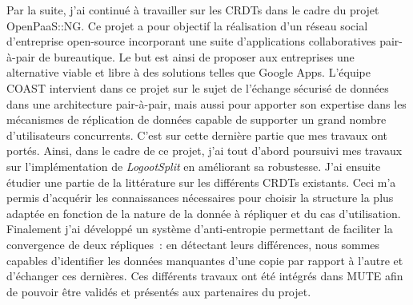 \documentclass[11pt,a4paper,sans]{moderncv}        %
\newcommand{\tab}{\quad \quad}
\begin{document}

\tab Par la suite, j'ai continué à travailler sur les CRDTs dans le cadre du projet OpenPaaS::NG.
Ce projet a pour objectif la réalisation d'un réseau social d'entreprise open-source
incorporant une suite d'applications collaboratives pair-à-pair de bureautique.
Le but est ainsi de proposer aux entreprises
une alternative viable et libre à des solutions telles que Google Apps.
L'équipe COAST intervient dans ce projet sur le sujet de
l'échange sécurisé de données dans une architecture pair-à-pair,
mais aussi pour apporter son expertise dans les mécanismes de réplication de données
capable de supporter un grand nombre d'utilisateurs concurrents.
C'est sur cette dernière partie que mes travaux ont portés.
Ainsi, dans le cadre de ce projet, j'ai tout d'abord poursuivi mes travaux
sur l'implémentation de \emph{LogootSplit} en améliorant sa robustesse.
J'ai ensuite étudier une partie de la littérature sur les différents CRDTs existants.
Ceci m'a permis d'acquérir les connaissances nécessaires pour choisir la structure la plus adaptée
en fonction de la nature de la donnée à répliquer et du cas d'utilisation.
Finalement j'ai développé un système d'anti-entropie
permettant de faciliter la convergence de deux répliques~:
en détectant leurs différences, nous sommes capables d'identifier les données
manquantes d'une copie par rapport à l'autre et d'échanger ces dernières.
Ces différents travaux ont été intégrés dans MUTE afin
de pouvoir être validés et présentés aux partenaires du projet.

\end{document}
